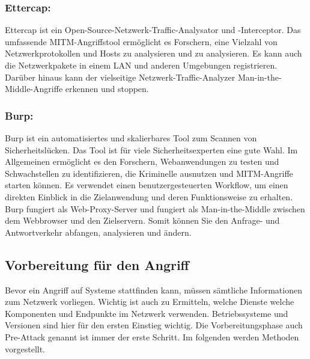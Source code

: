 \subsubsection{Ettercap:}
Ettercap ist ein Open-Source-Netzwerk-Traffic-Analysator und -Interceptor. Das umfassende MITM-Angriffstool ermöglicht es Forschern, eine Vielzahl von Netzwerkprotokollen und Hosts zu analysieren und zu analysieren. Es kann auch die Netzwerkpakete in einem LAN und anderen Umgebungen registrieren. Darüber hinaus kann der vielseitige Netzwerk-Traffic-Analyzer Man-in-the-Middle-Angriffe erkennen und stoppen.\cite{ref_url10}\par

\subsubsection{Burp:}
Burp ist ein automatisiertes und skalierbares Tool zum Scannen von Sicherheitslücken. Das Tool ist für viele Sicherheitsexperten eine gute Wahl. Im Allgemeinen ermöglicht es den Forschern, Webanwendungen zu testen und Schwachstellen zu identifizieren, die Kriminelle ausnutzen und MITM-Angriffe starten können. Es verwendet einen benutzergesteuerten Workflow, um einen direkten Einblick in die Zielanwendung und deren Funktionsweise zu erhalten. Burp fungiert als Web-Proxy-Server und fungiert als Man-in-the-Middle zwischen dem Webbrowser und den Zielservern. Somit können Sie den Anfrage- und Antwortverkehr abfangen, analysieren und ändern.\cite{ref_url10}\par

\subsection{Vorbereitung für den Angriff}
Bevor ein Angriff auf Systeme stattfinden kann, müssen sämtliche Informationen zum Netzwerk vorliegen. Wichtig ist auch zu Ermitteln, welche Dienste welche Komponenten und Endpunkte im Netzwerk verwenden. Betriebssysteme und Versionen sind hier für den ersten Einstieg wichtig. Die Vorbereitungsphase auch Pre-Attack genannt ist immer der erste Schritt. Im folgenden werden Methoden vorgestellt.\cite{ref_ieee_attack_9} 

